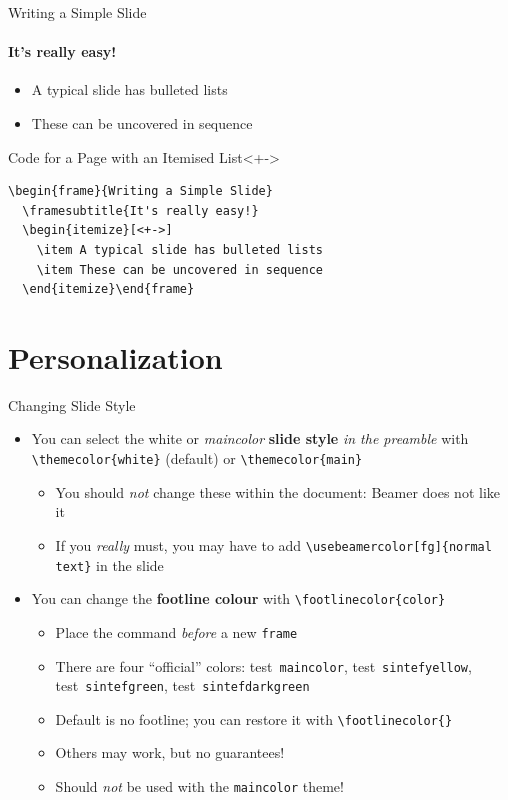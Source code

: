 \documentclass{beamer}
\newcommand{\testcolor}[1]{\colorbox{#1}{\textcolor{#1}{test}}~\texttt{#1}}
\begin{document}
\begin{frame}[fragile]{Writing a Simple Slide}
\framesubtitle{It's really easy!}
\begin{itemize}[<+->]
\item A typical slide has bulleted lists
\item These can be uncovered in sequence
\end{itemize}
\begin{block}{Code for a Page with an Itemised List}<+->
\begin{verbatim}
\begin{frame}{Writing a Simple Slide}
  \framesubtitle{It's really easy!}
  \begin{itemize}[<+->]
    \item A typical slide has bulleted lists
    \item These can be uncovered in sequence
  \end{itemize}\end{frame}
\end{verbatim}
\end{block}
\end{frame}

\section{Personalization}

\begin{frame}[fragile]{Changing Slide Style}
\begin{itemize}
\item You can select the white or \textit{maincolor} \textbf{slide style} \emph{in the 
preamble} with \verb|\themecolor{white}| (default) or \verb|\themecolor{main}|
      \begin{itemize}
      \item You should \emph{not} change these within the document: Beamer does 
      not like it
      \item If you \emph{really} must, you may have to add 
      \verb|\usebeamercolor[fg]{normal text}| in the slide
      \end{itemize}
\item You can change the \textbf{footline colour} with 
\verb|\footlinecolor{color}|
      \begin{itemize}
      \item Place the command \emph{before} a new \verb|frame|
      \item There are four ``official'' colors: 
      \testcolor{maincolor}, \testcolor{sintefyellow}, 
      \testcolor{sintefgreen}, \testcolor{sintefdarkgreen}
      \item Default is no footline; you can restore it with 
      \verb|\footlinecolor{}|
      \item Others may work, but no guarantees!
      \item Should \emph{not} be used with the \verb|maincolor| theme!
      \end{itemize}
\end{itemize}
\end{frame}
\end{document}
